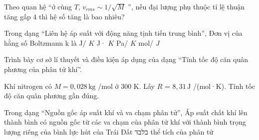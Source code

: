 \begin{ex}
Theo quan hệ “ở cùng $T$, $v_{rms}\sim1/\sqrt M$ ”, nếu đại lượng phụ thuộc tỉ lệ thuận tăng gấp 4 thì hệ số tăng là bao nhiêu?
\end{ex}

\begin{ex}
Trong dạng “Liên hệ áp suất với động năng tịnh tiến trung bình”, Đơn vị của hằng số Boltzmann k là
\choice
{\True J/ $K$}
{J· $K$}
{Pa/ $K$}
{mol/ $J$}
\end{ex}

\begin{ex}
Trình bày cơ sở lí thuyết và điều kiện áp dụng của dạng “Tính tốc độ căn quân phương của phân tử khí”.
\choiceTF

\end{ex}

\begin{ex}
Khí nitrogen có $M=0,028\,\text{kg}$ /mol ở 300 K. Lấy $R$ = $8,31\,\text{J}$ /(mol·K). Tính tốc độ căn quân phương gần đúng.
\end{ex}

\begin{ex}
Trong dạng “Nguồn gốc áp suất khí và va chạm phân tử”, Áp suất chất khí lên thành bình có nguồn gốc từ
\choice
{\True các va chạm của phân tử khí với thành bình}
{trọng lượng riêng của bình}
{lực hút của Trái Đất בלבד}
{thể tích của phân tử}
\end{ex}

